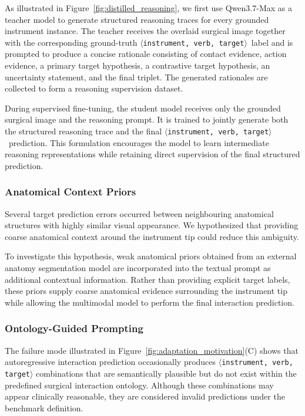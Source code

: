 \documentclass[11pt]{article}
\newcommand{\ivttriplet}{\texttt{$\langle$instrument, verb, target$\rangle$}\xspace}
\begin{document}
As illustrated in Figure~\ref{fig:distilled_reasoning}, we first use Qwen3.7-Max as a teacher model to generate structured reasoning traces for every grounded instrument instance. The teacher receives the overlaid surgical image together with the corresponding ground-truth \ivttriplet\ label and is prompted to produce a concise rationale consisting of contact evidence, action evidence, a primary target hypothesis, a contrastive target hypothesis, an uncertainty statement, and the final triplet. The generated rationales are collected to form a reasoning supervision dataset.

During supervised fine-tuning, the student model receives only the grounded surgical image and the reasoning prompt. It is trained to jointly generate both the structured reasoning trace and the final \ivttriplet\ prediction. This formulation encourages the model to learn intermediate reasoning representations while retaining direct supervision of the final structured prediction.

\subsubsection{Anatomical Context Priors}
Several target prediction errors occurred between neighbouring anatomical structures with highly similar visual appearance. We hypothesized that providing coarse anatomical context around the instrument tip could reduce this ambiguity.

To investigate this hypothesis, weak anatomical priors obtained from an external anatomy segmentation model are incorporated into the textual prompt as additional contextual information. Rather than providing explicit target labels, these priors supply coarse anatomical evidence surrounding the instrument tip while allowing the multimodal model to perform the final interaction prediction.

\subsubsection{Ontology-Guided Prompting}
The failure mode illustrated in Figure~\ref{fig:adaptation_motivation}(C) shows that autoregressive interaction prediction occasionally produces \ivttriplet combinations that are semantically plausible but do not exist within the predefined surgical interaction ontology. Although these combinations may appear clinically reasonable, they are considered invalid predictions under the benchmark definition.
\end{document}
